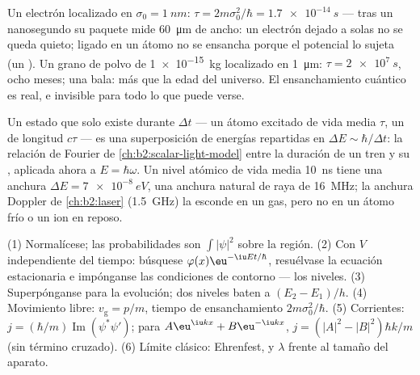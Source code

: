 \begin{example}\label{ex:b2:schrodinger-wave-functions:spreading}
Un electrón localizado en $\sigma_0 = \qty{1}{nm}$: $\tau = 2m\sigma_0^2/\hbar
= \qty{1.7e-14}{s}$ --- tras un nanosegundo su paquete mide \qty{60}{\micro m}
de ancho: un electrón dejado a solas no se queda quieto; ligado en un átomo
no se ensancha porque el potencial lo sujeta (un ).
Un grano de polvo de \qty{1e-15}{kg} localizado en \qty{1}{\micro m}: $\tau =
\qty{2e7}{s}$, ocho meses; una bala: más que la edad del universo.
El ensanchamiento cuántico es real, e invisible para todo lo que puede verse.
\end{example}

\begin{remark}\label{rem:b2:schrodinger-wave-functions:energytime}
Un estado que solo existe durante $\Delta t$ --- un átomo excitado de vida media
$\tau$, un  de longitud $c\tau$ --- es una superposición de energías
repartidas en $\Delta E \sim \hbar/\Delta t$: la relación de Fourier de
\cref{ch:b2:scalar-light-model} entre la duración de un tren y su
, aplicada ahora a $E = \hbar\omega$. Un nivel atómico de
vida media \qty{10}{ns} tiene una anchura $\Delta E = \qty{7e-8}{eV}$, una anchura
natural de raya de \qty{16}{MHz}; la anchura Doppler de \cref{ch:b2:laser}
(\qty{1.5}{GHz}) la esconde en un gas, pero no en un átomo frío o un ion en
reposo.
\end{remark}

\begin{method}\label{meth:b2:schrodinger-wave-functions:method}
(1) Normalícese; las probabilidades son $\int|\psi|^2$ sobre la región. (2)
Con $V$ independiente del tiempo: búsquese $\varphi(x)\eu^{-\iu Et/\hbar}$, resuélvase la
ecuación estacionaria e impónganse las condiciones de contorno --- los niveles.
(3) Superpónganse  para la evolución; dos niveles baten a
$(E_2 - E_1)/h$. (4) Movimiento libre: $v_{\text{g}} = p/m$, tiempo de ensanchamiento
$2m\sigma_0^2/\hbar$. (5) Corrientes: $j = (\hbar/m)\operatorname{Im}(\psi^*\psi')$;
para $A\eu^{\iu kx} + B\eu^{-\iu kx}$, $j = (|A|^2 - |B|^2)\hbar k/m$ (sin término cruzado).
(6) Límite clásico: Ehrenfest, y $\lambda$ frente al tamaño del
aparato.
\end{method}


